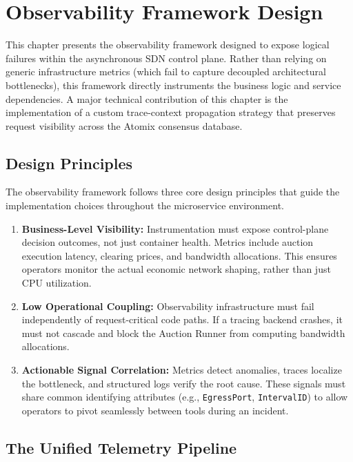 
\chapter{Observability Framework Design}
\label{chap:observability}

This chapter presents the observability framework designed to expose logical failures within the asynchronous SDN control plane. Rather than relying on generic infrastructure metrics (which fail to capture decoupled architectural bottlenecks), this framework directly instruments the business logic and service dependencies. A major technical contribution of this chapter is the implementation of a custom trace-context propagation strategy that preserves request visibility across the Atomix consensus database.

\section{Design Principles}

The observability framework follows three core design principles that guide the implementation choices throughout the microservice environment.

\begin{enumerate}
    \item \textbf{Business-Level Visibility:} Instrumentation must expose control-plane decision outcomes, not just container health. Metrics include auction execution latency, clearing prices, and bandwidth allocations. This ensures operators monitor the actual economic network shaping, rather than just CPU utilization.
    \item \textbf{Low Operational Coupling:} Observability infrastructure must fail independently of request-critical code paths. If a tracing backend crashes, it must not cascade and block the Auction Runner from computing bandwidth allocations.
    \item \textbf{Actionable Signal Correlation:} Metrics detect anomalies, traces localize the bottleneck, and structured logs verify the root cause. These signals must share common identifying attributes (e.g., \texttt{EgressPort}, \texttt{IntervalID}) to allow operators to pivot seamlessly between tools during an incident.
\end{enumerate}

\section{The Unified Telemetry Pipeline}

